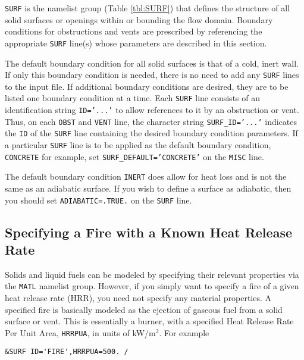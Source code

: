 \documentclass[11pt]{book}
\newcommand{\ct}{\tt\small}
\begin{document}
{\ct SURF} is the namelist group (Table \ref{tbl:SURF}) that defines
the structure of all solid surfaces or openings within or
bounding the flow domain. Boundary conditions for obstructions and vents are 
prescribed by referencing the appropriate {\ct SURF} line(s) whose
parameters are described in this section.

The default boundary condition for all solid surfaces is that of a
cold, inert wall. If only this
boundary condition is needed, there is no need to add any {\ct SURF} lines
to the input file. If additional boundary conditions are desired,
they are to be listed one boundary condition at a time.
Each {\ct SURF} line consists of an identification string {\ct ID='...'} to
allow references to it by an obstruction or vent. Thus, on each
{\ct OBST} and {\ct VENT} line, the character string {\ct SURF\_ID='...'}
indicates the {\ct ID} of the {\ct SURF} line containing the desired boundary
condition parameters. If a particular {\ct SURF} line is to be applied
as the default boundary condition, {\ct CONCRETE} for example,
set {\ct SURF\_DEFAULT='CONCRETE'} on the {\ct MISC} line.

\begin{notebox}
\noindent
The default boundary condition {\ct INERT} does allow for heat loss and is not the same as an adiabatic surface.
If you wish to define a surface as adiabatic, then you should set {\ct ADIABATIC=.TRUE.} on the {\ct SURF} line.
\end{notebox}


\subsection{Specifying a Fire with a Known Heat Release Rate}
 

Solids and liquid fuels can be modeled by specifying their relevant
properties via the {\ct MATL} namelist group. However, if you simply
want to specify a fire of a given heat release rate (HRR),
you need not specify any material properties. A specified fire is
basically modeled as the ejection of gaseous fuel
from a solid surface or vent. This is essentially a burner, with a
specified Heat Release Rate Per Unit Area, {\ct HRRPUA}, in units of
kW/m$^2$. For example

\footnotesize
\begin{verbatim}
&SURF ID='FIRE',HRRPUA=500. /
\end{verbatim}
\normalsize
\end{document}
